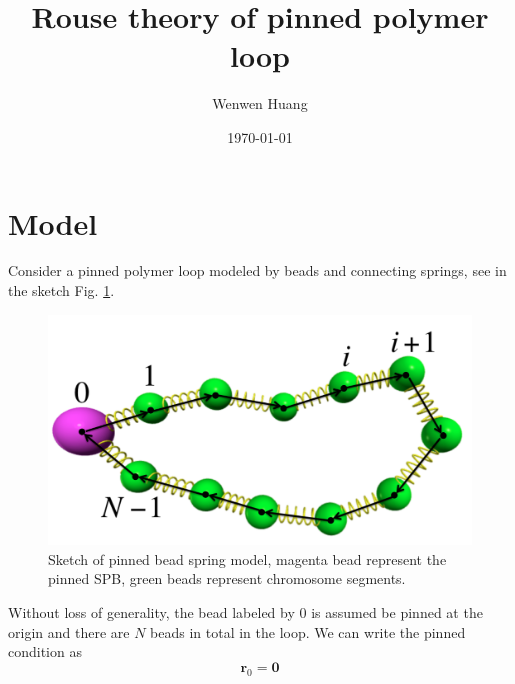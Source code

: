 \documentclass[12pt,a4paper]{article}
\begin{document}
\title{Rouse theory of pinned polymer loop}
\author{Wenwen Huang}
\date{\today}

\maketitle

\section{Model}
\label{sec:model}

Consider a pinned polymer loop modeled by beads and connecting springs, see in the sketch Fig. \ref{fig:beadSpring}.
\begin{figure}[htpb]
    \centering
    \includegraphics[width=0.8\linewidth]{beadSpring}
    \caption{Sketch of pinned bead spring model, magenta bead represent the
        pinned SPB, green beads represent chromosome segments.}
    \label{fig:beadSpring}
\end{figure}
Without loss of generality, the bead labeled by $0$ is assumed be pinned at the
origin and there are $N$ beads in total in the loop. We can write the pinned
condition as 
\begin{equation}
    \label{eq:pinCondition}
    \mathbf{r}_0 = \mathbf{0}
\end{equation}
\end{document}
